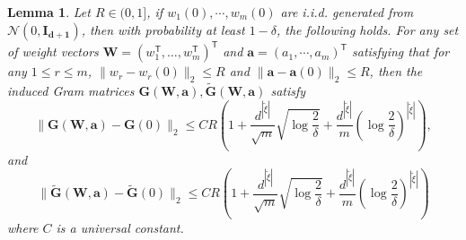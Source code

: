 \documentclass{article}
\newtheorem{lemma}{Lemma}
\newcommand{\T}{\mathsf{T}}
\begin{document}
\begin{lemma}\label{lem:step3}
	Let $R\in (0,1]$, if $w_1(0),\cdots,w_m(0)$ are i.i.d. generated from $\mathcal{N}(0,\mathbf{I_{d+1}})$, then with probability at least $1-\delta$, the following holds. 
    For any set of weight vectors $\mathbf{W}=(w_1^\T,\ldots, w_m^\T)^\T$ and $\mathbf{a}=(a_1, \cdots, a_m)^\T$ satisfying that for any $1\le r\le m$, $\|w_r-w_r(0)\|_2\leq R$ and $\|\mathbf{a}-\mathbf{a}(0)\|_{2}\leq R$,  then the induced Gram matrices $\mathbf{G}(\mathbf{W}, \mathbf{a}), \widetilde{\mathbf{G}}(\mathbf{W}, \mathbf{a})$ satisfy
	\begin{equation*}
		\|\mathbf{G}(\mathbf{W}, \mathbf{a})-\mathbf{G}(0)\|_2 \le CR\left(1+\frac{d^{|\tilde{\xi}|}}{\sqrt{m}} \sqrt{\log\frac{2}{\delta}} + \frac{d^{|\tilde{\xi}|}}{m}\left(\log\frac{2}{\delta}\right)^{|\tilde{\xi}|}\right), 
	\end{equation*}
    and
    \begin{equation*}
		\|\widetilde{\mathbf{G}}(\mathbf{W}, \mathbf{a})-\widetilde{\mathbf{G}}(0)\|_2 \le CR\left(1+\frac{d^{|\tilde{\xi}|}}{\sqrt{m}} \sqrt{\log\frac{2}{\delta}} + \frac{d^{|\tilde{\xi}|}}{m}\left(\log\frac{2}{\delta}\right)^{|\tilde{\xi}|}\right)
	\end{equation*}
	where $C$ is a universal constant.
\end{lemma}
\end{document}
